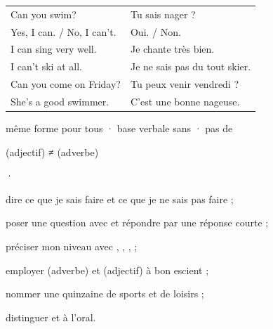 \begin{essentiel}
\begin{minipage}[t]{0.54\linewidth}
\renewcommand{\arraystretch}{1.32}
\begin{tabular}{@{}>{\enOn\otSemi\fontsize{9.4}{11}\selectfont}l<{\enOff}@{\hspace{3mm}}>{\fontsize{9.2}{11}\selectfont\color{white!78!otNavy}}l@{}}
Can you swim?              & Tu sais nager ?\\
Yes, I can. / No, I can't. & Oui. / Non.\\
I can sing very well.      & Je chante très bien.\\
I can't ski at all.        & Je ne sais pas du tout skier.\\
Can you come on Friday?    & Tu peux venir vendredi ?\\
She's a good swimmer.      & C'est une bonne nageuse.\\
\end{tabular}
\end{minipage}\hfill
\begin{minipage}[t]{0.41\linewidth}
{\fontsize{9.2}{11.6}\selectfont même forme pour tous · base verbale sans  · pas de \par}
{\par
{\fontsize{9}{11.4}\selectfont\color{white!78!otNavy} (adjectif) ≠  (adverbe)}\par}
{\fontsize{9.2}{11.6}\selectfont {}  ·  \par}
\end{minipage}
\end{essentiel}

\begin{jesais}
\item dire ce que je sais faire et ce que je ne sais pas faire ;
\item poser une question avec  et répondre par une réponse courte ;
\item préciser mon niveau avec , , ,  ;
\item employer  (adverbe) et  (adjectif) à bon escient ;
\item nommer une quinzaine de sports et de loisirs ;
\item distinguer  et  à l'oral.
\end{jesais}

